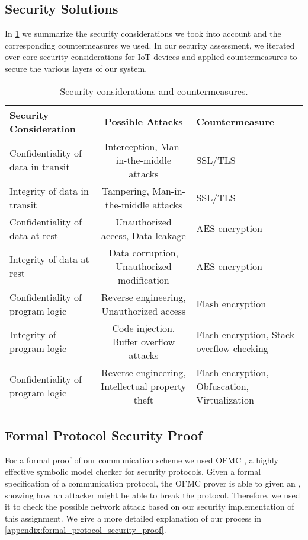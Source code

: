 \documentclass[conference]{IEEEtran}
\begin{document}
\subsection{Security Solutions}

In \cref{tab:security_considerations} we summarize the security considerations we took into account and the corresponding countermeasures we used.
In our security assessment, we iterated over core security considerations for IoT devices\cite{ComprehensiveSecurity} and applied countermeasures 
to secure the various layers of our system.

\begin{table}[h]
\centering
\begin{adjustbox}{width=\columnwidth,center}
\begin{tabular}{|l|c||l|}
\hline
\textbf{Security Consideration} & \textbf{Possible Attacks} & \textbf{Countermeasure} \\ \hline
Confidentiality of data in transit & Interception, Man-in-the-middle attacks          & SSL/TLS \\ \hline
Integrity of data in transit       & Tampering, Man-in-the-middle attacks             & SSL/TLS \\ \hline
Confidentiality of data at rest    & Unauthorized access, Data leakage                & AES encryption \\ \hline
Integrity of data at rest          & Data corruption, Unauthorized modification       & AES encryption \\ \hline
Confidentiality of program logic   & Reverse engineering, Unauthorized access         & Flash encryption \\ \hline
Integrity of program logic         & Code injection, Buffer overflow attacks          & Flash encryption, Stack overflow checking \\ \hline
Confidentiality of program logic   & Reverse engineering, Intellectual property theft & Flash encryption, Obfuscation, Virtualization \\ \hline
\end{tabular}
\end{adjustbox}
\caption{Security considerations and countermeasures.}
\label{tab:security_considerations}
\end{table}

\subsection{Formal Protocol Security Proof}
For a formal proof of our communication scheme we used
OFMC \cite{basin2005ofmc}, a highly effective symbolic model checker for security protocols.
Given a formal specification of a communication protocol, the OFMC prover is able to given an , showing how an attacker might be able to break the protocol.
Therefore, we used it to check the possible network attack based on our security implementation of this assignment.
We give a more detailed explanation of our process in \cref{appendix:formal_protocol_security_proof}.
\end{document}
